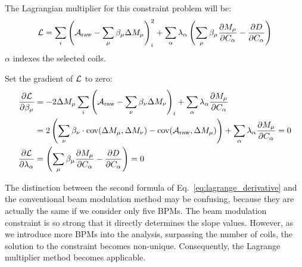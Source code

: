 The Lagrangian multiplier for this constraint problem will be:
\begin{equation}
    \mathcal{L} = \sum_i \left( \mathcal{A}_{\text{raw}} - \sum_\mu \beta_\mu \Delta M_\mu \right)_i^2+ \sum_\alpha \lambda_\alpha \left(\sum_\mu \beta_\mu \frac{\partial M_\mu}{\partial C_\alpha} - \frac{\partial D}{\partial C_\alpha} \right)
\end{equation}
$\alpha$ indexes the selected coils.

Set the gradient of $\mathcal{L}$ to zero:
\begin{equation}
    \begin{aligned}
	\frac{\partial \mathcal{L}}{\partial \beta_\mu} 
	&= -2\Delta M_\mu \sum_i \left( \mathcal{A}_{\text{raw}} 
	  - \sum_\nu \beta_\nu \Delta M_\nu \right)_i + \sum_\alpha \lambda_\alpha \frac{\partial M_\mu}{\partial C_\alpha}    \\
	&= 2 \left(\sum_\nu \beta_\nu \cdot \text{cov}(\Delta M_\mu, \Delta M_\nu) 
	  - \text{cov}(\mathcal{A}_{\text{raw}}, \Delta M_\mu) \right) + \sum_\alpha \lambda_\alpha \frac{\partial M_\mu}{\partial C_\alpha} = 0  \\
	\frac{\partial \mathcal{L}}{\partial \lambda_\alpha} &= \left( \sum_\mu \beta_\mu \frac{\partial M_\mu}{\partial C_\alpha} - \frac{\partial D}{\partial C_\alpha} \right) = 0\\
    \end{aligned}
    \label{eq:lagrange_derivative}
\end{equation}

The distinction between the second formula of Eq.~\ref{eq:lagrange_derivative} and
the conventional beam modulation method may be confusing, because they are actually
the same if we consider only five BPMs. The beam modulation constraint is so 
strong that it directly determines the slope values. However, as we introduce
more BPMs into the analysis, surpassing the number of coils, the solution
to the constraint becomes non-unique. Consequently, the Lagrange multiplier
method becomes applicable.

